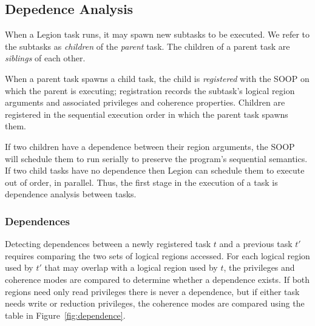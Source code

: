 

\subsection{Depedence Analysis}
\label{sec:dep}


When a Legion task runs, it may spawn new subtasks to be executed.  We refer to the
subtasks as {\em children} of the {\em parent} task.  The children of a parent task
are {\em siblings} of each other.

When a parent task spawns a child task, the child is {\em registered} with the SOOP 
on which the parent is executing; registration records the subtask's logical region
arguments and associated privileges and coherence properties.
Children are registered in the sequential execution order in which the parent task
spawns them.

If two children have a dependence between their region arguments, the
SOOP will schedule them to run serially to preserve the program's
sequential semantics.  If two child tasks have no dependence then
Legion can schedule them to execute out of order, in parallel.  Thus,
the first stage in the execution of a task is dependence analysis
between tasks.

\subsubsection{Dependences}
Detecting dependences between a newly registered task $t$ and a previous task 
$t'$ requires comparing the two sets of logical regions accessed.  For each logical region used by
$t'$ that may overlap with a logical region used by $t$, the privileges
and coherence modes are compared to determine whether a dependence exists.  If
both regions need only read privileges there is never a dependence, but if either
task needs write or reduction privileges, the coherence modes are compared using
the table in Figure~\ref{fig:dependence}.


